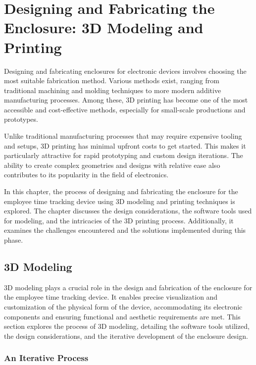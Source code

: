 \chapter{Designing and Fabricating the Enclosure: 3D Modeling and Printing}
\label{cap:3dModelingAndPrinting}


Designing and fabricating enclosures for electronic devices involves choosing the most suitable 
fabrication method. Various methods exist, ranging from traditional machining and molding 
techniques to more modern additive manufacturing processes. Among these, 3D printing has become 
one of the most accessible and cost-effective methods, especially for small-scale productions and 
prototypes.

Unlike traditional manufacturing processes that may require expensive tooling and setups, 3D 
printing has minimal upfront costs to get started. This makes it particularly attractive for rapid 
prototyping and custom design iterations. The ability to create complex geometries and designs 
with relative ease also contributes to its popularity in the field of electronics.

In this chapter, the process of designing and fabricating the enclosure for the employee time 
tracking device using 3D modeling and printing techniques is explored. The chapter discusses the 
design considerations, the software tools used for modeling, and the intricacies of the 3D 
printing process. Additionally, it examines the challenges encountered and the solutions 
implemented during this phase.


%
%

\section{3D Modeling}

3D modeling plays a crucial role in the design and fabrication of the enclosure for the employee 
time tracking device. It enables precise visualization and customization of the physical form of 
the device, accommodating its electronic components and ensuring functional and aesthetic 
requirements are met. This section explores the process of 3D modeling, detailing the software 
tools utilized, the design considerations, and the iterative development of the enclosure design. 

\subsection{An Iterative Process}

